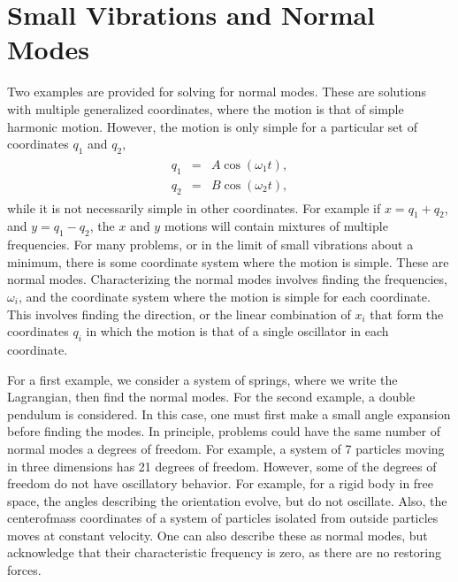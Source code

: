 \documentclass[letterpaper,10pt,english]{sphinxmanual}
\begin{document}
\section{Small Vibrations and Normal Modes}
\label{\detokenize{chapter1:small-vibrations-and-normal-modes}}
Two examples are provided for solving for normal modes. These are
solutions with multiple generalized coordinates, where the motion is
that of simple harmonic motion. However, the motion is only simple for
a particular set of coordinates \(q_1\) and \(q_2\),
\begin{equation*}
\begin{split}
\begin{eqnarray}
q_1&=&A\cos(\omega_1 t),\\
\nonumber
q_2&=&B\cos(\omega_2 t),
\end{eqnarray}
\end{split}
\end{equation*}
while it is not necessarily simple in other coordinates. For example
if \(x=q_1+q_2\), and \(y=q_1-q_2\), the \(x\) and \(y\) motions will contain
mixtures of multiple frequencies. For many problems, or in the limit
of small vibrations about a minimum, there is some coordinate system
where the motion is simple. These are normal modes. Characterizing the
normal modes involves finding the frequencies, \(\omega_i\), and the
coordinate system where the motion is simple for each coordinate. This
involves finding the direction, or the linear combination of \(x_i\)
that form the coordinates \(q_i\) in which the motion is that of a
single oscillator in each coordinate.

For a first example, we consider a system of springs, where we write
the Lagrangian, then find the normal modes. For the second example, a
double pendulum is considered. In this case, one must first make a
small angle expansion before finding the modes. In principle, problems
could have the same number of normal modes a degrees of freedom. For
example, a system of 7 particles moving in three dimensions has 21
degrees of freedom. However, some of the degrees of freedom do not
have oscillatory behavior. For example, for a rigid body in free
space, the angles describing the orientation evolve, but do not
oscillate. Also, the center\sphinxhyphen{}of\sphinxhyphen{}mass coordinates of a system of
particles isolated from outside particles moves at constant
velocity. One can also describe these as normal modes, but acknowledge
that their characteristic frequency is zero, as there are no restoring
forces.
\end{document}
